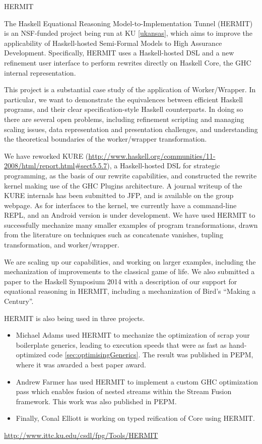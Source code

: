 \begin{hcarentry}[updated]{HERMIT}
\label{HERMIT}
\makeheader

The Haskell Equational Reasoning Model-to-Implementation Tunnel
(HERMIT) is an NSF-funded project being run at KU \cref{ukansas}, which aims to improve the
applicability of Haskell-hosted Semi-Formal Models to High Assurance Development.
Specifically, HERMIT uses a Haskell-hosted DSL
and a new refinement user interface to perform rewrites directly on Haskell Core, the GHC internal representation.

This project is a substantial case study of the application of
Worker/Wrapper. In particular, we want to
demonstrate the equivalences between efficient Haskell programs, and
their clear specification-style Haskell counterparts. In doing so
there are several open problems, including refinement scripting and
managing scaling issues, data representation and presentation
challenges, and understanding the theoretical boundaries of the
worker/wrapper transformation.

We have reworked KURE (\url{http://www.haskell.org/communities/11-2008/html/report.html#sect5.5.7}),
a Haskell-hosted DSL for strategic programming, as the basis of our rewrite capabilities,
and constructed the rewrite kernel making use of the GHC Plugins architecture.
A journal writeup of the KURE internals has been submitted to JFP, and is available
on the group webpage.
As for interfaces to the kernel,
we currently have a command-line REPL, and an Android version is under development.
We have used HERMIT to successfully mechanize many smaller examples of program transformations,
drawn from the literature on techniques such as concatenate vanishes, tupling transformation, and worker/wrapper.

We are scaling up our capabilities, and working on larger examples,
including the mechanization of improvements to the classical game of life.
We also submitted a paper to the Haskell Symposium 2014 with a description of
our support for equational reasoning in HERMIT, including a mechanization
of Bird's ``Making a Century''.

HERMIT is also being used in three projects.
\begin{itemize}
\item Michael Adams used HERMIT to mechanize the optimization of scrap
  your boilerplate generics, leading to execution speeds that were as
  fast as hand-optimized code \cref{sec:optimisingGenerics}. The
  result was published in PEPM, where it was awarded a best paper
  award.
\item Andrew Farmer has used HERMIT to implement a custom GHC
  optimization pass which enables fusion of nested streams within the
  Stream Fusion framework.  This work was also published in PEPM.
\item Finally, Conal Elliott is working on typed reification of Core using HERMIT.
\end{itemize}

\FurtherReading
  \url{http://www.ittc.ku.edu/csdl/fpg/Tools/HERMIT}
\end{hcarentry}
